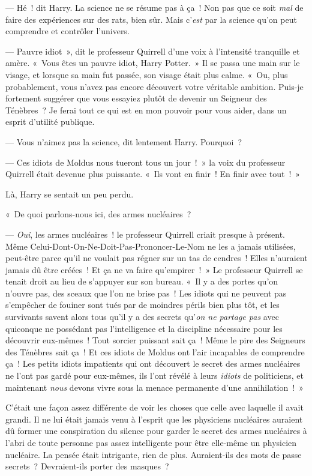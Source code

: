 --- Hé~! dit Harry. La science ne se résume pas à ça~! Non pas que ce soit \emph{mal} de faire des expériences sur des rats, bien sûr. Mais c'\emph{est} par la science qu'on peut comprendre et contrôler l'univers.

--- Pauvre idiot~», dit le professeur Quirrell d'une voix à l'intensité tranquille et amère. «~Vous êtes un pauvre idiot, Harry Potter.~» Il se passa une main sur le visage, et lorsque sa main fut passée, son visage était plus calme. «~Ou, plus probablement, vous n'avez pas encore découvert votre véritable ambition. Puis-je fortement suggérer que vous essayiez plutôt de devenir un Seigneur des Ténèbres~? Je ferai tout ce qui est en mon pouvoir pour vous aider, dans un esprit d'utilité publique.

--- Vous n'aimez pas la science, dit lentement Harry. Pourquoi~?

--- Ces idiots de Moldus nous tueront tous un jour~!~» la voix du professeur Quirrell était devenue plus puissante. «~Ils vont en finir~! En finir avec tout~!~»

Là, Harry se sentait un peu perdu.

«~De quoi parlons-nous ici, des armes nucléaires~?

--- \emph{Oui}, les armes nucléaires~! le professeur Quirrell criait presque à présent. Même Celui-Dont-On-Ne-Doit-Pas-Prononcer-Le-Nom ne les a jamais utilisées, peut-être parce qu'il ne voulait pas régner sur un tas de cendres~! Elles n'auraient jamais dû être créées~! Et ça ne va faire qu'empirer~!~» Le professeur Quirrell se tenait droit au lieu de s'appuyer sur son bureau. «~Il y a des portes qu'on n'ouvre pas, des sceaux que l'on ne brise pas~! Les idiots qui ne peuvent pas s'empêcher de fouiner sont tués par de moindres périls bien plus tôt, et les survivants savent alors tous qu'il y a des secrets qu'\emph{on ne partage pas} avec quiconque ne possédant pas l'intelligence et la discipline nécessaire pour les découvrir eux-mêmes~! Tout sorcier puissant sait ça~! Même le pire des Seigneurs des Ténèbres sait ça~! Et ces idiots de Moldus ont l'air incapables de comprendre ça~! Les petits idiots impatients qui ont découvert le secret des armes nucléaires ne l'ont pas gardé pour eux-mêmes, ils l'ont révélé à leurs \emph{idiots} de politiciens, et maintenant \emph{nous} devons vivre sous la menace permanente d'une annihilation~!~»

C'était une façon assez différente de voir les choses que celle avec laquelle il avait grandi. Il ne lui était jamais venu à l'esprit que les physiciens nucléaires auraient dû former une conspiration du silence pour garder le secret des armes nucléaires à l'abri de toute personne pas assez intelligente pour être elle-même un physicien nucléaire. La pensée était intrigante, rien de plus. Auraient-ils des mots de passe secrets~? Devraient-ils porter des masques~?

